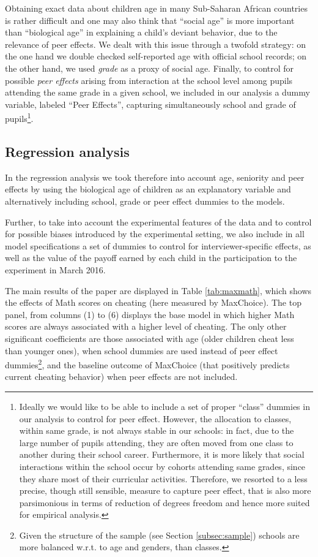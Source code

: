 \documentclass[authoryear, preprint, review, 12pt]{elsarticle}
\begin{document}
Obtaining exact data about children age in many Sub-Saharan African countries is rather difficult and one may also think that \enquote{social age} is more important than \enquote{biological age} in explaining a child's deviant behavior, due to the relevance of peer effects. We dealt with this issue through a twofold strategy: on the one hand we double checked self-reported age with official school records; on the other hand, we used \textit{grade} as a proxy of social age. Finally, to control for possible \textit{peer effects} arising from interaction at the school level among pupils attending the same grade in a given school, we included in our analysis a dummy variable, labeled \enquote{Peer Effects}, capturing simultaneously school and grade of pupils\footnote{Ideally we would like to be able to include a set of proper \enquote{class} dummies in our analysis to control for peer effect. However, the allocation to classes, within same grade, is not always stable in our schools: in fact, due to the large number of pupils attending, they are often moved from one class to another during their school career. Furthermore, it is more likely that social interactions within the school occur by cohorts attending same grades, since they share most of their curricular activities. Therefore, we resorted to a less precise, though still sensible, measure to capture peer effect, that is also more parsimonious in terms of reduction of degrees freedom and hence more suited for empirical analysis.}.

\subsection{Regression analysis}
\label{sec:Regressions}

In the regression analysis we took therefore into account age, seniority and peer effects by using the biological age of children as an explanatory variable and alternatively including school, grade or peer effect dummies to the models. 

Further, to take into account the experimental features of the data and to control for possible biases introduced by the experimental setting, we also include in all model specifications a set of dummies to control for interviewer-specific effects, as well as the value of the payoff earned by each child in the participation to the experiment in March 2016.

The main results of the paper are displayed in Table \ref{tab:maxmath}, which shows the effects of Math scores on cheating (here measured by MaxChoice). The top panel, from columns (1) to (6) displays the base model in which higher Math scores are always associated with a higher level of cheating. The only other significant coefficients are those associated with age (older children cheat less than younger ones), when school dummies are used instead of peer effect dummies\footnote{Given the structure of the sample (see Section \ref{subsec:sample}) schools are more balanced w.r.t. to age and genders, than classes.}, and the baseline outcome of MaxChoice (that positively predicts current cheating behavior) when peer effects are not included.
\end{document}
